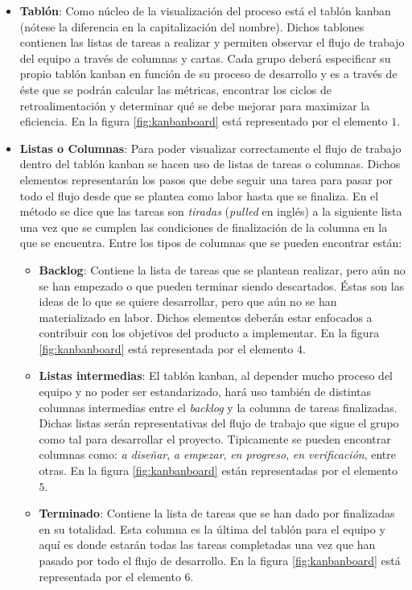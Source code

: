\begin{itemize}
    \item \textbf{Tablón}: %
    Como núcleo de la visualización del proceso está el tablón kanban (nótese la
    diferencia en la capitalización del nombre). Dichos tablones contienen las
    listas de tareas a realizar y permiten observar el flujo de trabajo del
    equipo a través de columnas y cartas. Cada grupo deberá especificar su
    propio tablón kanban en función de su proceso de desarrollo y es a través de
    éste que se podrán calcular las métricas, encontrar los ciclos de
    retroalimentación y determinar qué se debe mejorar para maximizar la
    eficiencia. En la figura \ref{fig:kanbanboard} está representado por el
    elemento $1$.

    \item \textbf{Listas o Columnas}:
    Para poder visualizar correctamente el flujo de trabajo dentro del tablón
    kanban se hacen uso de listas de tareas o columnas. Dichos elementos
    representarán los pasos que debe seguir una tarea para pasar por todo el
    flujo desde que se plantea como labor hasta que se finaliza. En el método se
    dice que las tareas son \emph{tiradas} (\emph{pulled} en inglés) a la
    siguiente lista una vez que se cumplen las condiciones de finalización de la
    columna en la que se encuentra. Entre los tipos de columnas que se pueden
    encontrar están:
    \begin{itemize}
        \item \textbf{Backlog}: Contiene la lista de tareas que se plantean
        realizar, pero aún no se han empezado o que pueden terminar siendo
        descartados. Éstas son las ideas de lo que se quiere desarrollar, pero
        que aún no se han materializado en labor. Dichos elementos deberán estar
        enfocados a contribuir con los objetivos del producto a implementar. En
        la figura \ref{fig:kanbanboard} está representada por el elemento $4$.
        \item \textbf{Listas intermedias}: El tablón kanban, al depender mucho
        proceso del equipo y no poder ser estandarizado, hará uso también de
        distintas columnas intermedias entre el \emph{backlog} y la columna de
        tareas finalizadas. Dichas listas serán representativas del flujo de
        trabajo que sigue el grupo como tal para desarrollar el proyecto.
        Tipicamente se pueden encontrar columnas como: \emph{a diseñar}, \emph{a
        empezar}, \emph{en progreso}, \emph{en verificación}, entre otras. En la
        figura \ref{fig:kanbanboard} están representadas por el elemento $5$.
        \item \textbf{Terminado}: Contiene la lista de tareas que se han dado
        por finalizadas en su totalidad. Esta columna es la última del tablón
        para el equipo y aquí es donde estarán todas las tareas completadas una
        vez que han pasado por todo el flujo de desarrollo. En la figura
        \ref{fig:kanbanboard} está representada por el elemento $6$.
    \end{itemize}


\end{itemize}
